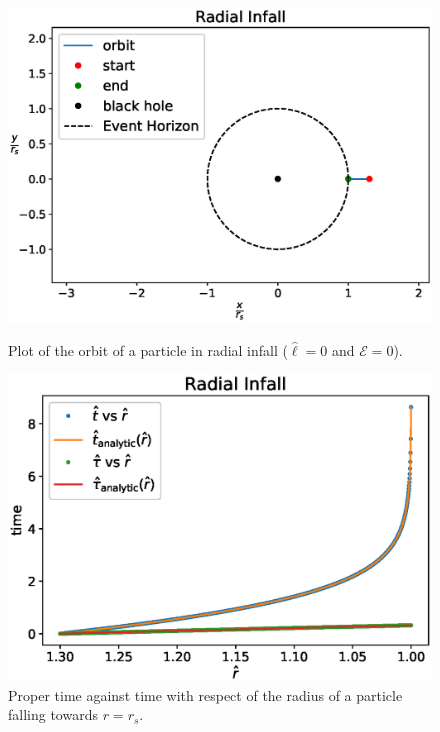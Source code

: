 \begin{figure}[h]
    \begin{minipage}{0.48\textwidth}
        \centering
        \includegraphics[width=\textwidth]{Figures/chapter2/radial_infall_plot.eps}
        \caption{Plot of the orbit of a particle in radial infall ($\hat \ell = 0$
        and $\mathcal E = 0$). \\}
    \end{minipage}
    \hspace{0.015 \textwidth}
    \begin{minipage}{0.48\textwidth}
        \centering
        \includegraphics[width=\textwidth]{Figures/chapter2/radial_infall.eps}
        \caption{Proper time against \Sh time with respect of the radius of a
        particle falling towards $r = r_s$.}
    \end{minipage}
\end{figure}

